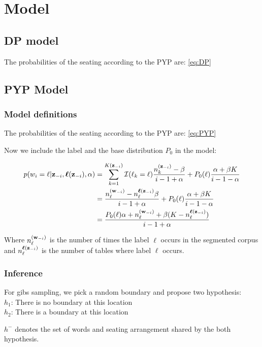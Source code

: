 \section{Model}

\subsection{DP model}

The probabilities of the seating according to the PYP are: \eqref{eq:DP}
\subsection{PYP Model}
\subsubsection{Model definitions}

The probabilities of the seating according to the PYP are: \eqref{eq:PYP}

Now we include the label and the base distribution $P_0$ in the model:

\begin{align}
p(w_i=\ell|\bm{\mathbf{z}}_{-i},\bm{\mathbf{\ell}}(\bm{\mathbf{z}}_{-i}),\alpha) &= \sum_{k=1}^{K(\bm{\mathbf{z}}_{-i})}\mathcal{I}(\ell_k=\ell)\dfrac{n_k^{(\bm{\mathbf{z}}_{-i})}-\beta}{i - 1 + \alpha} + P_0(\ell)\dfrac{\alpha + \beta K}{i -1 -\alpha} \\
&= \dfrac{n_{\ell}^{(\bm{\mathbf{w}}_{-i})}- n_{\ell}^{\bm{\mathbf{\ell}}(\bm{\mathbf{z}}_{-i})}\beta}{i - 1 + \alpha} + P_0(\ell)\dfrac{\alpha + \beta K}{i -1 -\alpha} \\
&= \dfrac{P_0(\ell)\alpha + n_{\ell}^{(\bm{\mathbf{w}}_{-i})}+ \beta (K - n_{\ell}^{\bm{\mathbf{\ell}}(\bm{\mathbf{z}}_{-i})})}{i - 1 + \alpha} 
\end{align}

Where $n_{\ell}^{(\bm{\mathbf{w}}_{-i})}$ is the number of times the label $\ell$ occurs in the segmented corpus and $n_{\ell}^{\bm{\mathbf{\ell}}(\bm{\mathbf{z}}_{-i})}$ is the number of tables where label $\ell$ occurs.

\subsubsection{Inference}

For gibs sampling, we pick a random boundary and propose two hypothesis:
\\
$h_1$: There is no boundary at this location \\
$h_2$: There is a boundary at this location


$h^-$ denotes the set of words and seating arrangement shared by the both hypothesis.

